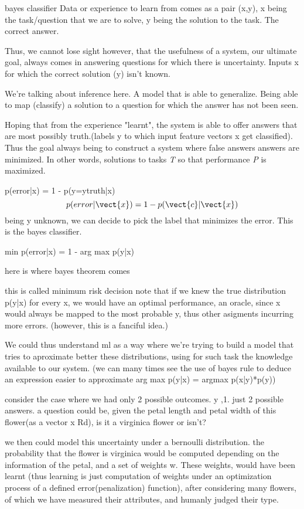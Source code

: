 \documentclass[11pt,english,listoffigures,listoftables]{tfgetsinf}
\begin{document}
bayes classifier
Data or experience to learn from comes as a pair (x,y),
x being the task/question that we are to solve, y being  the solution to the task. The correct answer.

Thus, we cannot lose sight however, that the usefulness of a system, our ultimate goal, always comes in answering questions for which there is uncertainty. Inputs x for which the correct solution (y) isn't known.

We're talking about inference here. A model that is able to generalize. Being able to map (classify) a solution to a question for which the answer has not been seen.

Hoping that from the experience "learnt", the system is able to offer answers that are most possibly truth.(labels y to which input feature vectors x get classified). 
Thus the goal always being to construct a system where false answers answers are minimized. In other words, solutions to tasks \textit{T} so that performance \textit{P} is maximized.

p(error|x) = 1 - p(y=ytruth|x)
\begin{equation}
    p(error | \vect{x}) = 1 - p(\vect{c} | \vect{x})
\end{equation}
being y unknown, we can decide to pick the label that minimizes the error. This is the bayes classifier.

min p(error|x) = 1 - arg max p(y|x)

here is where bayes theorem comes



this is called minimum risk decision
note that if we knew the true distribution p(y|x) for every x, we would have an optimal performance, an oracle, since x would always be mapped to the most probable y, thus other asigments incurring more errors. (however, this is a fanciful idea.)

We could thus understand ml as a way where we're trying to build a model that tries to aproximate better these distributions, using for such task the knowledge available to our system. (we can many times see the use of bayes rule to deduce an expression easier to approximate arg max p(y|x) = argmax p(x|y)*p(y))


consider the case where we had only 2 possible outcomes. y ,1. just 2 possible answers. a question could be, given the petal length and petal width of this flower(as a vector x \in Rd), is it a virginica flower or isn't?

we then could model this uncertainty under a bernoulli distribution. the probability that the flower is virginica would be computed depending on the information of the petal, and a set of weights w. These weights, would have been learnt (thus learning is just computation of weights under an optimization process of a defined error(penalization) function), after considering many flowers, of which we have measured their attributes, and humanly judged their type.
\end{document}
